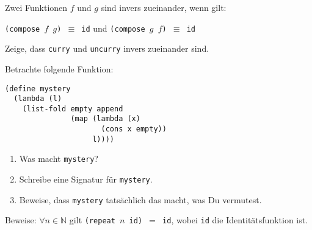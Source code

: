 \begin{aufgabe}
  Zwei Funktionen $f$ und $g$ sind invers
  zueinander, wenn gilt:

  \begin{center}
    \texttt{(compose $f$ $g$) $\equiv$ id} und \texttt{(compose $g$ $f$) $\equiv$ id}
  \end{center}

  Zeige, dass \texttt{curry} und \texttt{uncurry} invers zueinander sind.
\end{aufgabe}

\begin{aufgabe}
  Betrachte folgende Funktion:

  \begin{lstlisting}
(define mystery
  (lambda (l)
    (list-fold empty append
               (map (lambda (x)
                      (cons x empty))
                    l))))
  \end{lstlisting}

  \begin{enumerate}
  \item Was macht \texttt{mystery}?

  \item Schreibe eine Signatur für \texttt{mystery}.

  \item Beweise, dass \texttt{mystery} tatsächlich das macht, was
    Du vermutest.
  \end{enumerate}
\end{aufgabe}

\begin{aufgabe}
  Beweise: $\forall n \in \mathbb{N}$ gilt
  \texttt{(repeat $n$ id) $=$ id}, wobei \texttt{id} die
  Identitätsfunktion ist.
\end{aufgabe}


